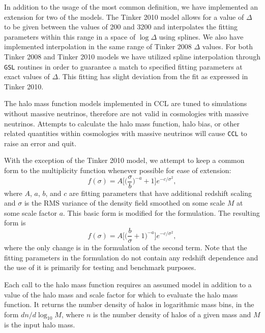 \documentclass[\docopts]{\docclass}
\newcommand{\ccl}{{\tt CCL}\xspace}
\begin{document}
In addition to the usage of the most common definition, we have implemented an
extension for two of the models. The Tinker 2010 model allows for a value of
$\Delta$ to be given between the values of 200 and 3200 and interpolates the
fitting parameters within this range in a space of $\log \Delta$ using splines.
We also have implemented interpolation in the same range of Tinker 2008 $\Delta$
values. For both Tinker 2008 and Tinker 2010 models we have utilized spline
interpolation through {\tt GSL} routines in order to guarantee a match to
specified fitting parameters at exact values of $\Delta$. This fitting has
slight deviation from the fit as expressed in Tinker 2010.

The halo mass function models implemented in CCL are tuned to simulations
without massive neutrinos, therefore are not valid in cosmologies with massive
neutrinos. Attempts to calculate the halo mass function, halo bias, or other
related quantities within cosmologies with massive neutrinos will cause \ccl to
raise an error and quit.

With the exception of the Tinker 2010 model, we attempt to keep a common form
to the multiplicity function whenever possible for ease of extension:
\begin{equation}
f(\sigma)=A\Big[\Big(\frac{\sigma}{b}\Big)^{-a}+1\Big]e^{-c/{\sigma}^2},
\end{equation}
where $A$, $a$, $b$, and $c$ are fitting parameters that have additional
redshift scaling and $\sigma$ is the RMS variance of the density field smoothed
on some scale $M$ at some scale factor $a$. This basic form is modified for
the \citet{Angulo2012} formulation. The resulting form is
\begin{equation}
f(\sigma)=A\Big[\Big(\frac{b}{\sigma}+1\Big)^{-a}\Big]e^{-c/{\sigma}^2},
\end{equation}
where the only change is in the formulation of the second term. Note that the
fitting parameters in the \citet{Angulo2012} formulation do not contain any
redshift dependence and the use of it is primarily for testing and benchmark purposes.

Each call to the halo mass function requires an assumed model in addition to a
value of the halo mass and scale factor for which to evaluate the halo mass
function. It returns the number density of halos in logarithmic mass bins,
in the form $dn/d\log_{10}{M}$, where $n$ is the number density of halos of a
given mass and $M$ is the input halo mass.
\end{document}
